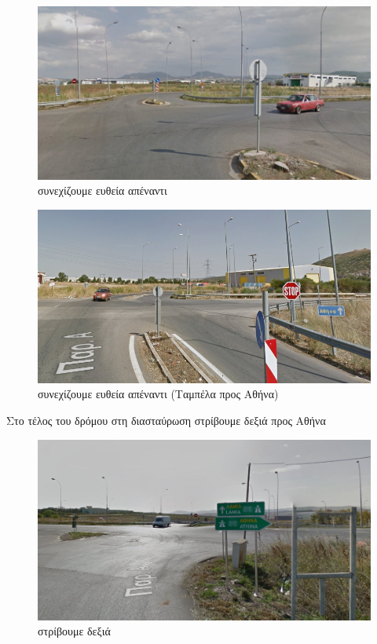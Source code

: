 \begin{figure}[H]
\includegraphics[width=\textwidth]{images/lamia-athina/thiva/thiva_016.jpg} 
\caption{συνεχίζουμε ευθεία απέναντι}
\end{figure}
\begin{figure}[H]
\includegraphics[width=\textwidth]{images/lamia-athina/thiva/thiva_017.jpg} 
\caption{συνεχίζουμε ευθεία απέναντι (Ταμπέλα προς Αθήνα)}
\end{figure}
Στο τέλος του δρόμου στη διασταύρωση στρίβουμε δεξιά προς Αθήνα
\begin{figure}[H]
\includegraphics[width=\textwidth]{images/lamia-athina/thiva/thiva_018.jpg} 
\caption{στρίβουμε δεξιά}
\end{figure}
